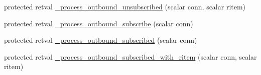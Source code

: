 \begin{Indent}
\begin{DoxyCompactItemize}
\item 
protected retval \hyperlink{class_d_jabberd_1_1_presence_ade340e67943834cefcf19b7b4c327d3f}{\-\_\-process\-\_\-outbound\-\_\-unsubscribed} (scalar conn, scalar ritem)
\item 
protected retval \hyperlink{class_d_jabberd_1_1_presence_a69c8ae4a1c30826fc916a65d4d38d68f}{\-\_\-process\-\_\-outbound\-\_\-subscribe} (scalar conn)
\item 
protected retval \hyperlink{class_d_jabberd_1_1_presence_a6883d2691ad39e27c9ca9dbc2ad3195c}{\-\_\-process\-\_\-outbound\-\_\-subscribed} (scalar conn)
\item 
protected retval \hyperlink{class_d_jabberd_1_1_presence_a066b5f06a4c704684aeecfe4053eda47}{\-\_\-process\-\_\-outbound\-\_\-subscribed\-\_\-with\-\_\-ritem} (scalar conn, scalar ritem)
\end{DoxyCompactItemize}
\end{Indent}


